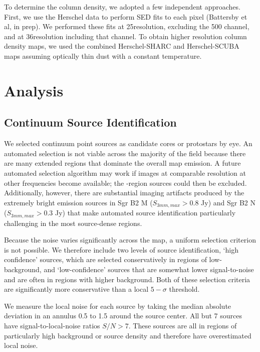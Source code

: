 \documentclass{emulateapj}
\begin{document}
To determine the column density, we adopted a few independent approaches.
First, we use the Herschel data to perform SED fits to each pixel (Battersby et
al, in prep).  We performed these fits at 25\arcsec resolution, excluding the
500 \um channel, and at 36\arcsec resolution including that channel.  To
obtain higher resolution column density maps, we used the combined
Herschel-SHARC and Herschel-SCUBA maps assuming optically thin dust with a
constant temperature.




\section{Analysis}

\subsection{Continuum Source Identification}
\label{sec:contsources}
We selected continuum point sources as candidate cores or protostars by eye.
An automated selection is not viable across the majority of the field because
there are many extended \hii regions that dominate the overall map emission.  A
future automated selection algorithm may work if images at comparable
resolution at other frequencies become available; the \hii-region sources could
then be excluded.  Additionally, however, there are substantial imaging
artifacts produced by the extremely bright emission sources in Sgr B2 M ($S_{3
mm,max} > 0.8$ Jy) and Sgr B2 N ($S_{3 mm,max} > 0.3$ Jy) that make automated
source identification particularly challenging in the most source-dense regions.

Because the noise varies significantly across the map, a uniform selection
criterion is not possible.  We therefore include two levels of source
identification, `high confidence' sources, which are selected conservatively in
regions of low-background, and `low-confidence' sources that are somewhat lower
signal-to-noise and are often in regions with higher background.  Both of
these selection criteria are significantly more conservative than a local
$5-\sigma$ threshold.

We measure the local noise for each source by taking the median absolute
deviation in an annulus 0.5 to 1.5 \arcsec around the source center.
All but 7 sources have signal-to-local-noise ratios $S/N>7$.  These
sources are all in regions of particularly high background or source
density and therefore have overestimated local noise.
\end{document}
